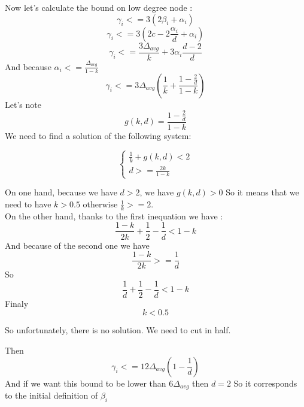 \documentclass{article}
\begin{document}
Now let's calculate the bound on low degree node :
$$\gamma_i <= 3(2\beta_i+\alpha_i)$$
$$\gamma_i <= 3(2c - 2\frac{\alpha_i}{d} + \alpha_i)$$
$$\gamma_i <= \frac{3\Delta_{avg}}{k} + 3\alpha_i\frac{d-2}{d}$$
And because $\alpha_i <= \frac{\Delta_{avg}}{1-k}$
$$\gamma_i <= 3\Delta_{avg}\left(\frac{1}{k}+\frac{1-\frac{2}{d}}{1-k}\right)$$
Let's note $$g(k,d) = \frac{1-\frac{2}{d}}{1-k}$$
We need to find a solution of the following system:

\begin{equation*}
\begin{cases}
  \frac{1}{k} + g(k,d) < 2\\
  d >= \frac{2k}{1-k}
\end{cases}
\end{equation*}

On one hand, because we have $d > 2$, we have $g(k, d) > 0$ So it means that we need
to have $k > 0.5$ otherwise $\frac{1}{k} >= 2$.\\

On the other hand, thanks to the first inequation we have :
$$\frac{1-k}{2k} + \frac{1}{2} - \frac{1}{d} < 1-k$$
And because of the second one we have 
$$\frac{1-k}{2k} >= \frac{1}{d}$$
So $$\frac{1}{d} + \frac{1}{2} - \frac{1}{d} < 1 - k$$
Finaly $$k < 0.5$$

So unfortunately, there is no solution. We need to cut in half.

Then $$\gamma_i <= 12\Delta_{avg}\left(1-\frac{1}{d}\right)$$
And if we want this bound to be lower than $6\Delta_{avg}$ then $d = 2$
So it corresponds to the initial definition of $\beta_i$ 
\end{document}
